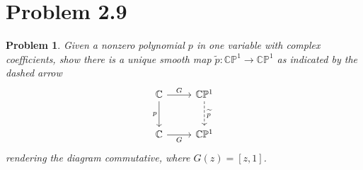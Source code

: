 \documentclass[11pt, letterpaper]{article}
\theoremstyle{theorem}
\newtheorem{problem}{Problem}
\begin{document}
\section{Problem 2.9}
\begin{problem}\label{7}
	Given a nonzero polynomial $p$ in one variable with complex coefficients, show there is a unique smooth map $\widetilde{p} : \mathbb{C} \mathbb{P} ^1 \to \mathbb{C} \mathbb{P} ^1$ as indicated by the dashed arrow
	\[\begin{tikzcd}[row sep = 2.5em, column sep = 2.5em]
	\mathbb{C} \ar[" G ", r] \ar[" p "', d]  & \mathbb{C} \mathbb{P}^1 \ar[" \widetilde{p}  ", dashed, d]  \\
	\mathbb{C} \ar[" G "', r]  & \mathbb{C} \mathbb{P} ^1
	\end{tikzcd}\]
	rendering the diagram commutative, where $G(z)=[z,1]$.
\end{problem}
\end{document}
